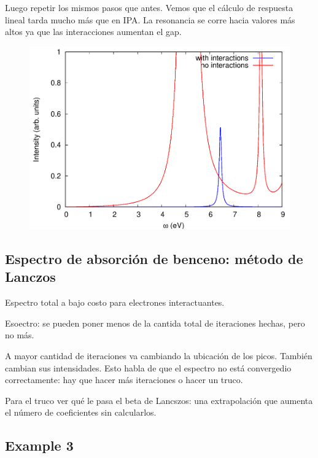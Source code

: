   Luego repetir los mismos pasos que antes. Vemos que el cálculo de respuesta lineal tarda mucho más que en IPA. La resonancia se corre hacia valores más altos ya que las interacciones aumentan el gap.
  \begin{figure}[H]
      \centering
      \includegraphics[scale = 0.6]{figs/D6/Benceno_inter.png}
  \end{figure}

\subsection{Espectro de absorción de benceno: método de Lanczos}

  Espectro total a bajo costo para electrones interactuantes.

  Esoectro: se pueden poner menos de la cantida total de iteraciones hechas, pero no más.

  A mayor cantidad de iteraciones va cambiando la ubicación de los picos. También cambian sus intensidades. Esto habla de que el espectro no está convergedio correctamente: hay que hacer más iteraciones o hacer un truco.

  Para el truco ver qué le pasa el beta de Lancszos: una extrapolación que aumenta el número de coeficientes sin calcularlos.















\subsection{Example 3}

